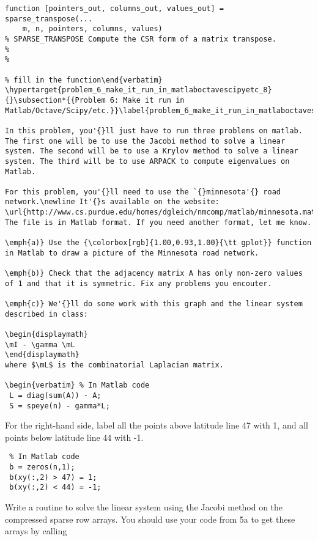 \documentclass{article}
\begin{document}
\begin{verbatim}function [pointers_out, columns_out, values_out] = sparse_transpose(...
	m, n, pointers, columns, values)
% SPARSE_TRANSPOSE Compute the CSR form of a matrix transpose.
%
% 

% fill in the function\end{verbatim}
\hypertarget{problem_6_make_it_run_in_matlaboctavescipyetc_8}{}\subsection*{{Problem 6: Make it run in Matlab/Octave/Scipy/etc.}}\label{problem_6_make_it_run_in_matlaboctavescipyetc_8}

In this problem, you'{}ll just have to run three problems on matlab. The first one will be to use the Jacobi method to solve a linear system. The second will be to use a Krylov method to solve a linear system. The third will be to use ARPACK to compute eigenvalues on Matlab.

For this problem, you'{}ll need to use the `{}minnesota'{} road network.\newline It'{}s available on the website: \url{http://www.cs.purdue.edu/homes/dgleich/nmcomp/matlab/minnesota.mat} The file is in Matlab format. If you need another format, let me know.

\emph{a)} Use the {\colorbox[rgb]{1.00,0.93,1.00}{\tt gplot}} function in Matlab to draw a picture of the Minnesota road network.

\emph{b)} Check that the adjacency matrix A has only non-zero values of 1 and that it is symmetric. Fix any problems you encouter.

\emph{c)} We'{}ll do some work with this graph and the linear system described in class:

\begin{displaymath}
\mI - \gamma \mL
\end{displaymath}
where $\mL$ is the combinatorial Laplacian matrix.

\begin{verbatim} % In Matlab code
 L = diag(sum(A)) - A;
 S = speye(n) - gamma*L;\end{verbatim}
For the right-hand side, label all the points above latitude line 47 with 1, and all points below latitude line 44 with -1.

\begin{verbatim} % In Matlab code
 b = zeros(n,1);
 b(xy(:,2) > 47) = 1;
 b(xy(:,2) < 44) = -1;\end{verbatim}
Write a routine to solve the linear system using the Jacobi method on the compressed sparse row arrays. You should use your code from 5a to get these arrays by calling
\end{document}
